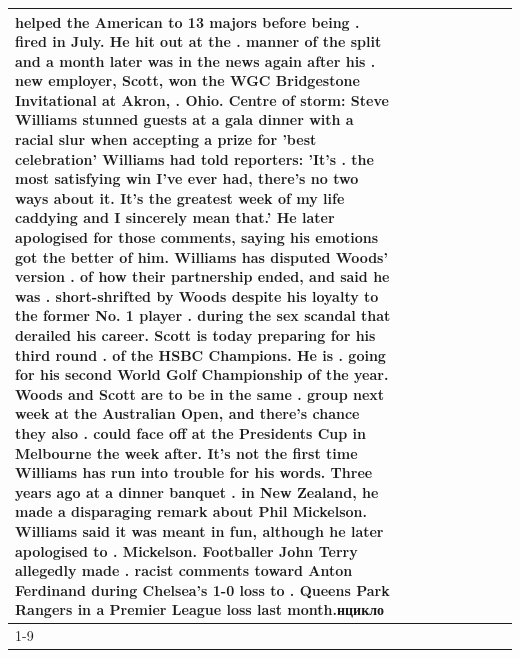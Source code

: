 \begin{table}[H]
\begin{tabular}{lllrlllll}
helped the American to 13 majors before being . fired in July. He hit out at the . manner of the split and a month later was in the news again after his . new employer, Scott, won the WGC Bridgestone Invitational at Akron, . Ohio. Centre of storm: Steve Williams stunned guests at a gala dinner with a racial slur when accepting a prize for 'best celebration' Williams had told reporters: 'It's . the most satisfying win I've ever had, there's no two ways about it. It's the greatest week of my life caddying and I sincerely mean that.' He later apologised for those comments, saying his emotions got the better of him. Williams has disputed Woods' version . of how their partnership ended, and said he was . short-shrifted by Woods despite his loyalty to the former No. 1 player . during the sex scandal that derailed his career. Scott is today preparing for his third round . of the HSBC Champions. He is . going for his second World Golf Championship of the year. Woods and Scott are to be in the same . group next week at the Australian Open, and there's chance they also . could face off at the Presidents Cup in Melbourne the week after. It's not the first time Williams has run into trouble for his words. Three years ago at a dinner banquet . in New Zealand, he made a disparaging remark about Phil Mickelson. Williams said it was meant in fun, although he later apologised to . Mickelson. Footballer John Terry allegedly made . racist comments toward Anton Ferdinand during Chelsea's 1-0 loss to . Queens Park Rangers in a Premier League loss last month.нцикло \\
\cline{1-9}

\end{tabular}
\end{table}
